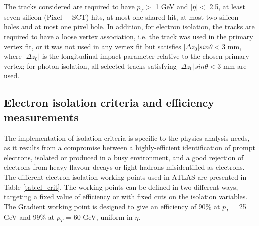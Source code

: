 \documentclass[a4paper, oneside, 11pt, openright]{book}
\begin{document}
\begin{itemize}
			The tracks considered are required to have $p_T >$ 1 GeV and $|\eta| <$ 2.5, at least seven silicon (Pixel + SCT) hits, at most one shared hit, at most two silicon holes and at most one pixel hole. In addition, for electron isolation, the tracks are required to have a loose vertex association, i.e. the track was used in the primary vertex fit, or it was not used in any vertex fit but satisfies $|\Delta z_0|sin{\theta} < 3$ mm, where $|\Delta z_0|$ is the longitudinal impact parameter relative to the chosen primary vertex; for photon
			isolation, all selected tracks satisfying $|\Delta z_0|sin{\theta} < 3$ mm are used.
		\end{itemize}
		
		\subsection{Electron isolation criteria and efficiency measurements}
			The implementation of isolation criteria is specific to the physics analysis needs, as it results from a compromise between a highly-efficient identification of prompt electrons, isolated or produced in a busy environment, and a good rejection of electrons from heavy-flavour decays or light hadrons misidentified as electrons. The different electron-isolation working points used in ATLAS are presented in Table \ref{tab:el_crit}.
			The working points can be defined in two different ways, targeting a fixed value of efficiency
			or with fixed cuts on the isolation variables. The Gradient working point is designed to give an
			efficiency of 90\% at $p_T$ = 25 GeV and 99\% at $p_T$ = 60 GeV, uniform in $\eta$.
			
			
			\begin{center}
				\small
				\begin{table}[htbp]
					\caption{Definition of the electron isolation working points and isolation efficiency $\epsilon$.}
					\label{tab:el_crit} 
				\end{table}
			\end{center}
\end{document}
